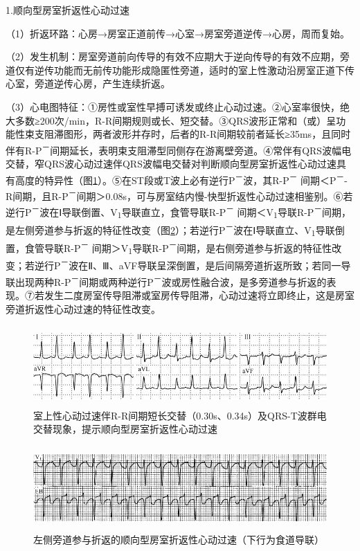 1.顺向型房室折返性心动过速

（1）折返环路：心房→房室正道前传→心室→房室旁道逆传→心房，周而复始。

（2）发生机制：房室旁道前向传导的有效不应期大于逆向传导的有效不应期，旁道仅有逆传功能而无前传功能形成隐匿性旁道，适时的室上性激动沿房室正道下传心室，旁道逆传心房，产生连续折返。

（3）心电图特征：①房性或室性早搏可诱发或终止心动过速。②心室率很快，绝大多数≥200次/min，R-R间期规则或长、短交替。③QRS波形正常和（或）呈功能性束支阻滞图形，两者波形并存时，后者的R-R间期较前者延长≥35ms，且同时伴有R-P\textsuperscript{－}间期延长，表明束支阻滞型同侧存在游离壁旁道。④常伴有QRS波幅电交替，窄QRS波心动过速伴QRS波幅电交替对判断顺向型房室折返性心动过速具有高度的特异性（图\ref{fig14-17}）。⑤在ST段或T波上必有逆行P\textsuperscript{－}波，其R-P\textsuperscript{－} 间期＜P\textsuperscript{－}-R间期，且R-P\textsuperscript{－}间期＞0.08s，可与房室结内慢-快型折返性心动过速相鉴别。⑥若逆行P\textsuperscript{－}波在Ⅰ导联倒置、V\textsubscript{1}导联直立，食管导联R-P\textsuperscript{－} 间期＜V\textsubscript{1}导联R-P\textsuperscript{－}间期，是左侧旁道参与折返的特征性改变（图\ref{fig14-18}）；若逆行P\textsuperscript{－}波在Ⅰ导联直立、V\textsubscript{1}导联倒置，食管导联R-P\textsuperscript{－} 间期＞V\textsubscript{1}导联R-P\textsuperscript{－}间期，是右侧旁道参与折返的特征性改变；若逆行P\textsuperscript{－}波在Ⅱ、Ⅲ、aVF导联呈深倒置，是后间隔旁道折返所致；若同一导联出现两种R-P\textsuperscript{－}间期或两种逆行P\textsuperscript{－}波或房性融合波，是多旁道参与折返的表现。⑦若发生二度房室传导阻滞或室房传导阻滞，心动过速将立即终止，这是房室旁道折返性心动过速的特征性改变。

\begin{figure}[!htbp]
 \centering
 \includegraphics[width=5.3125in,height=1.20833in]{./images/Image00263.jpg}
 \captionsetup{justification=centering}
 \caption{室上性心动过速伴R-R间期短长交替（0.30s、0.34s）及QRS-T波群电交替现象，提示顺向型房室折返性心动过速}
 \label{fig14-17}
  \end{figure} 

\begin{figure}[!htbp]
 \centering
 \includegraphics[width=5.58333in,height=1.27083in]{./images/Image00264.jpg}
 \captionsetup{justification=centering}
 \caption{左侧旁道参与折返的顺向型房室折返性心动过速（下行为食道导联）}
 \label{fig14-18}
  \end{figure} 

